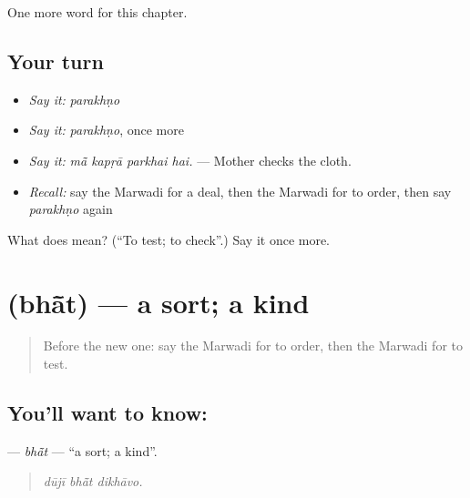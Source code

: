 \begin{grammarlens}[title={What you've built}]
One more word for this chapter.
\end{grammarlens}

\subsection*{Your turn}
\begin{itemize}
\raggedright
  \item \emph{Say it:} \emph{parakhṇo}
  \item \emph{Say it:} \emph{parakhṇo}, once more
  \item \emph{Say it:} \emph{mā̃ kapṛā parkhai hai.} — Mother checks the cloth.
  \item \emph{Recall:} say the Marwadi for a deal, then the Marwadi for to order, then say \emph{parakhṇo} again
\end{itemize}

\begin{tcolorbox}[breakable,colback=teal!4,colframe=teal!35!black,title={Before you move on}]
What does  mean? (\textquotedblleft{}To test; to check\textquotedblright{}.) Say it once more.
\end{tcolorbox}
\section[\texorpdfstring{\mw{भांत} (bhā̃t)}{भांत (bhā̃t)}]{ (bhā̃t) — a sort; a kind}

\label{lesson:MW-C210-bhat}



\begin{quote}
Before the new one: say the Marwadi for to order, then the Marwadi for to test.
\end{quote}

\subsection*{You'll want to know: }
\textbf{} — \emph{bhā̃t} — \textquotedblleft{}a sort; a kind\textquotedblright{}.

\begin{quote}
  
\end{quote}

\begin{quote}
\emph{dūjī bhā̃t dikhāvo.}
\end{quote}


